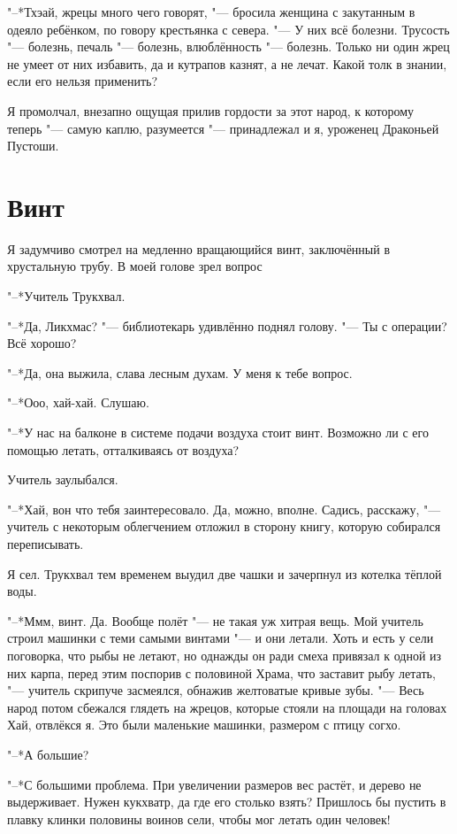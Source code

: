 \documentclass[a4paper,10pt,fleqn]{book}
\newcommand{\ldotst}{\so{...}\xspace}
\begin{document}
"--*Тхэай, жрецы много чего говорят, "--- бросила женщина с закутанным в одеяло ребёнком, по говору крестьянка с севера.
"--- У них всё болезни.
Трусость "--- болезнь, печаль "--- болезнь, влюблённость "--- болезнь.
Только ни один жрец не умеет от них избавить, да и кутрапов казнят, а не лечат.
Какой толк в знании, если его нельзя применить?

Я промолчал, внезапно ощущая прилив гордости за этот народ, к которому теперь "--- самую каплю, разумеется "--- принадлежал и я, уроженец Драконьей Пустоши.

\section{Винт}

Я задумчиво смотрел на медленно вращающийся винт, заключённый в хрустальную трубу. В моей голове зрел вопрос\ldotst

"--*Учитель Трукхвал.

"--*Да, Ликхмас? "--- библиотекарь удивлённо поднял голову.
"--- Ты с операции?
Всё хорошо?

"--*Да, она выжила, слава лесным духам.
У меня к тебе вопрос.

"--*Ооо, хай-хай.
Слушаю.

"--*У нас на балконе в системе подачи воздуха стоит винт.
Возможно ли с его помощью летать, отталкиваясь от воздуха?

Учитель заулыбался.

"--*Хай, вон что тебя заинтересовало.
Да, можно, вполне.
Садись, расскажу, "--- учитель с некоторым облегчением отложил в сторону книгу, которую собирался переписывать.

Я сел.
Трукхвал тем временем выудил две чашки и зачерпнул из котелка тёплой воды.

"--*Ммм, винт.
Да.
Вообще полёт "--- не такая уж хитрая вещь.
Мой учитель строил машинки с теми самыми винтами "--- и они летали.
Хоть и есть у сели поговорка, что рыбы не летают, но однажды он ради смеха привязал к одной из них карпа, перед этим поспорив с половиной Храма, что заставит рыбу летать, "--- учитель скрипуче засмеялся, обнажив желтоватые кривые зубы.
"--- Весь народ потом сбежался глядеть на жрецов, которые стояли на площади на головах\ldotst
Хай, отвлёкся я.
Это были маленькие машинки, размером с птицу согхо.

"--*А большие?

"--*С большими проблема.
При увеличении размеров вес растёт, и дерево не выдерживает.
Нужен кукхватр, да где его столько взять?
Пришлось бы пустить в плавку клинки половины воинов сели, чтобы мог летать один человек!
\end{document}
